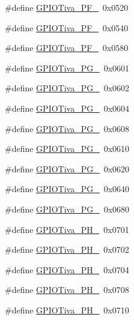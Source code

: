 \begin{DoxyCompactItemize}
\#define \hyperlink{_g_p_i_o_tiva_8h_aca739ca29aae70f20d726005c28c158f}{G\+P\+I\+O\+Tiva\+\_\+\+P\+F\+\_}~0x0520
\item 
\#define \hyperlink{_g_p_i_o_tiva_8h_aa7c249ed1d5263a6399aeb0f6d788d4c}{G\+P\+I\+O\+Tiva\+\_\+\+P\+F\+\_}~0x0540
\item 
\#define \hyperlink{_g_p_i_o_tiva_8h_ab23004eafd0e8bb0528326acb216f859}{G\+P\+I\+O\+Tiva\+\_\+\+P\+F\+\_}~0x0580
\item 
\#define \hyperlink{_g_p_i_o_tiva_8h_ae845d9b593cc046324f824e737702a46}{G\+P\+I\+O\+Tiva\+\_\+\+P\+G\+\_}~0x0601
\item 
\#define \hyperlink{_g_p_i_o_tiva_8h_a6ce4543162d65182b6a8a1efb4052306}{G\+P\+I\+O\+Tiva\+\_\+\+P\+G\+\_}~0x0602
\item 
\#define \hyperlink{_g_p_i_o_tiva_8h_ad2b11065a2982e10678dd62a45cdc37b}{G\+P\+I\+O\+Tiva\+\_\+\+P\+G\+\_}~0x0604
\item 
\#define \hyperlink{_g_p_i_o_tiva_8h_a1f0a88e175221a66eb8535e80b824ed0}{G\+P\+I\+O\+Tiva\+\_\+\+P\+G\+\_}~0x0608
\item 
\#define \hyperlink{_g_p_i_o_tiva_8h_ae90631d70fef39d80fd927bb0d23f8d7}{G\+P\+I\+O\+Tiva\+\_\+\+P\+G\+\_}~0x0610
\item 
\#define \hyperlink{_g_p_i_o_tiva_8h_af10c71a3c2b57da16639f819e3cf396e}{G\+P\+I\+O\+Tiva\+\_\+\+P\+G\+\_}~0x0620
\item 
\#define \hyperlink{_g_p_i_o_tiva_8h_aa15966016833ed3e5b0356c23d98006e}{G\+P\+I\+O\+Tiva\+\_\+\+P\+G\+\_}~0x0640
\item 
\#define \hyperlink{_g_p_i_o_tiva_8h_a7f5d9f6d0d09496cca6dce47880b481f}{G\+P\+I\+O\+Tiva\+\_\+\+P\+G\+\_}~0x0680
\item 
\#define \hyperlink{_g_p_i_o_tiva_8h_ae9f379bd90b51d9be15d2b3f6befc086}{G\+P\+I\+O\+Tiva\+\_\+\+P\+H\+\_}~0x0701
\item 
\#define \hyperlink{_g_p_i_o_tiva_8h_a95f2251987b44ad562ba014843bbeb89}{G\+P\+I\+O\+Tiva\+\_\+\+P\+H\+\_}~0x0702
\item 
\#define \hyperlink{_g_p_i_o_tiva_8h_a670f400a2c5760fa69d8cbb50239f9cc}{G\+P\+I\+O\+Tiva\+\_\+\+P\+H\+\_}~0x0704
\item 
\#define \hyperlink{_g_p_i_o_tiva_8h_aceb746e405ca062da6516caaeeaf23f6}{G\+P\+I\+O\+Tiva\+\_\+\+P\+H\+\_}~0x0708
\item 
\#define \hyperlink{_g_p_i_o_tiva_8h_a39229deb118c486b413833b29573afac}{G\+P\+I\+O\+Tiva\+\_\+\+P\+H\+\_}~0x0710
\item 

\end{DoxyCompactItemize}
